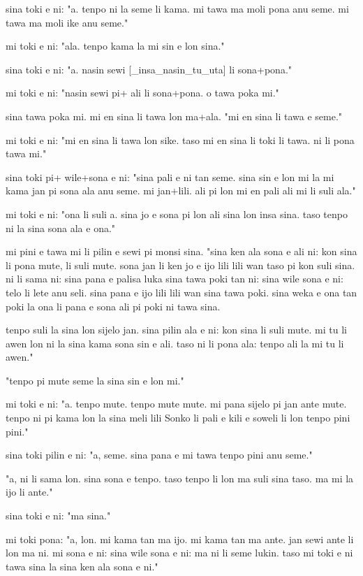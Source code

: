 \documentclass{article}
\begin{document}
sina toki e ni: "a. tenpo ni la seme li kama. mi tawa ma moli pona anu seme. mi tawa ma moli ike anu seme."

mi toki e ni: "ala. tenpo kama la mi sin e lon sina."

sina toki e ni: "a. nasin sewi {[}\_insa\_nasin\_tu\_uta{]} li sona+pona."

mi toki e ni: "nasin sewi pi+ ali li sona+pona. o tawa poka mi."

sina tawa poka mi. mi en sina li tawa lon ma+ala. "mi en sina li tawa e seme."

mi toki e ni: "mi en sina li tawa lon sike. taso mi en sina li toki li tawa. ni li pona tawa mi."

sina toki pi+ wile+sona e ni: "sina pali e ni tan seme. sina sin e lon mi la mi kama jan pi sona ala anu seme. mi jan+lili. ali pi lon mi en pali ali mi li suli ala."

mi toki e ni: "ona li suli a. sina jo e sona pi lon ali sina lon insa sina. taso tenpo ni la sina sona ala e ona."

mi pini e tawa mi li pilin e sewi pi monsi sina. "sina ken ala sona e ali ni: kon sina li pona mute, li suli mute. sona jan li ken jo e ijo lili lili wan taso pi kon suli sina. ni li sama ni: sina pana e palisa luka sina tawa poki tan ni: sina wile sona e ni: telo li lete anu seli. sina pana e ijo lili lili wan sina tawa poki. sina weka e ona tan poki la ona li pana e sona ali pi poki ni tawa sina.

tenpo suli la sina lon sijelo jan. sina pilin ala e ni: kon sina li suli mute. mi tu li awen lon ni la sina kama sona sin e ali. taso ni li pona ala: tenpo ali la mi tu li awen."

"tenpo pi mute seme la sina sin e lon mi."

mi toki e ni: "a. tenpo mute. tenpo mute mute. mi pana sijelo pi jan ante mute. tenpo ni pi kama lon la sina meli lili Sonko li pali e kili e soweli li lon tenpo pini pini."

sina toki pilin e ni: "a, seme. sina pana e mi tawa tenpo pini anu seme."

"a, ni li sama lon. sina sona e tenpo. taso tenpo li lon ma suli sina taso. ma mi la ijo li ante."

sina toki e ni: "ma sina."

mi toki pona: "a, lon. mi kama tan ma ijo. mi kama tan ma ante. jan sewi ante li lon ma ni. mi sona e ni: sina wile sona e ni: ma ni li seme lukin. taso mi toki e ni tawa sina la sina ken ala sona e ni."
\end{document}
